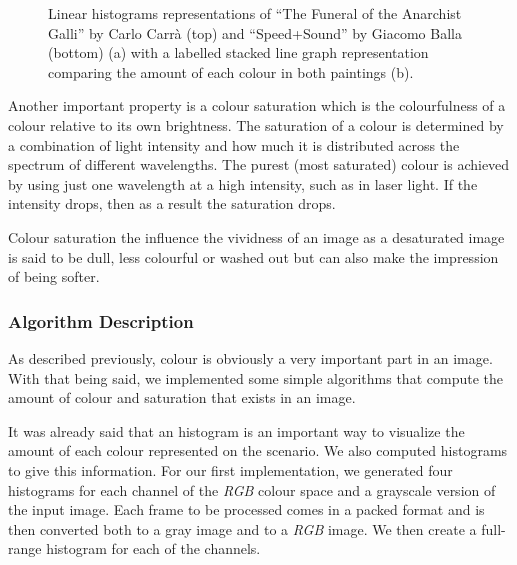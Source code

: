 \begin{figure}[htb]
	\centering
  \caption{Linear histograms representations of “The Funeral of the Anarchist Galli” by Carlo Carrà (top) and “Speed+Sound” by Giacomo Balla (bottom) (a) with a labelled stacked line graph representation comparing the amount of each colour in both paintings (b).}
  \label{fig:colourvis2}
\end{figure}

Another important property is a colour saturation which is the colourfulness of a colour relative to its own brightness. The saturation of a colour is determined by a combination of light intensity and how much it is distributed across the spectrum of different wavelengths. The purest (most saturated) colour is achieved by using just one wavelength at a high intensity, such as in laser light. If the intensity drops, then as a result the saturation drops.

Colour saturation the influence the vividness of an image as a desaturated image is said to be dull, less colourful or washed out but can also make the impression of being softer. 


\subsubsection{Algorithm Description}

As described previously, colour is obviously a very important part in an image. With that being said, we implemented some simple algorithms that compute the amount of colour and saturation that exists in an image.

It was already said that an histogram is an important way to visualize the amount of each colour represented on the scenario. We also computed histograms to give this information. For our first implementation, we generated four histograms for each channel of the \emph{RGB} colour space and a grayscale version of the input image. Each frame to be processed comes in a packed format and is then converted both to a gray image and to a \emph{RGB} image. We then create a full-range histogram for each of the channels.

